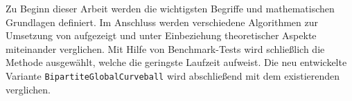 Zu Beginn dieser Arbeit werden die wichtigsten Begriffe und mathematischen Grundlagen definiert.
Im Anschluss werden verschiedene Algorithmen zur Umsetzung von \gc{}  aufgezeigt und unter Einbeziehung 
theoretischer Aspekte miteinander verglichen.
Mit Hilfe von Benchmark-Tests wird schließlich die Methode ausgewählt, welche die geringste Laufzeit 
aufweist. Die neu entwickelte Variante \texttt{BipartiteGlobalCurveball} wird abschließend 
mit dem existierenden \cb{} verglichen.
